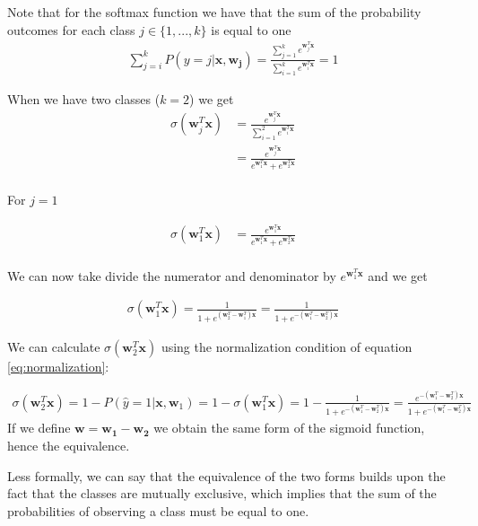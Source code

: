 \documentclass[a4paper]{article}
\begin{document}
Note that for the softmax function we have that the sum of the probability outcomes for each class $j \in \{1,...,k\}$ is equal to one
\begin{align} \label{eq:normalization}
    \sum_{j=i}^{k} P(y=j | \mathbf{x}, \mathbf{w_j}) =
    \frac{\sum^k_{j=1}e^{\mathbf{w}^T_j\mathbf{x}}}{\sum^k_{i=1}e^{\mathbf{w}^T_i\mathbf{x}}} =
    1
\end{align}


When we have two classes ($k = 2$) we get
\begin{align*}
\sigma(\mathbf{w}^T_j\mathbf{x}) &= \frac{e^{\mathbf{w}^T_j\mathbf{x}}}{\sum^2_{i=1}e^{\mathbf{w}^T_i\mathbf{x}}} \\
&= \frac{e^{\mathbf{w}^T_j\mathbf{x}}}{e^{\mathbf{w}^T_1\mathbf{x}} + e^{\mathbf{w}^T_2\mathbf{x}}} \\
\end{align*}

For $j = 1$

\begin{align*}
\sigma(\mathbf{w}^T_1\mathbf{x}) &= \frac{e^{\mathbf{w}^T_1\mathbf{x}}}{e^{\mathbf{w}^T_1\mathbf{x}} + e^{\mathbf{w}^T_2\mathbf{x}}} \\
\end{align*}

We can now take divide the numerator and denominator by $e^{\mathbf{w}^T_1\mathbf{x}}$ and we get

\begin{align*}
\sigma(\mathbf{w}^T_1\mathbf{x}) = \frac{1}{1 + e^{(\mathbf{w}^T_2-\mathbf{w}^T_1)\mathbf{x}}} 
= \frac{1}{1 + e^{- (\mathbf{w}^T_1-\mathbf{w}^T_2)\mathbf{x}}}
\end{align*}

We can calculate $\sigma(\mathbf{w}^T_2\mathbf{x})$ using the normalization condition of equation \ref{eq:normalization}:

\begin{align*}
\sigma(\mathbf{w}^T_2\mathbf{x}) = 1 - P(\hat{y} = 1 | \mathbf{x},\mathbf{w}_1) = 1 - \sigma(\mathbf{w}^T_1\mathbf{x}) = 1 - \frac{1}{1 + e^{- (\mathbf{w}^T_1-\mathbf{w}^T_2)\mathbf{x}}} = \frac{e^{- (\mathbf{w}^T_1-\mathbf{w}^T_2)\mathbf{x}}}{1 + e^{- (\mathbf{w}^T_1-\mathbf{w}^T_2)\mathbf{x}}}
\end{align*}
If we define $\mathbf{w} = \mathbf{w_1} - \mathbf{w_2}$ we obtain the same form of the sigmoid function, hence the equivalence.

Less formally, we can say that the equivalence of the two forms builds upon the fact that the classes are mutually exclusive, which implies that the sum of the probabilities of observing a class must be equal to one.
\end{document}
